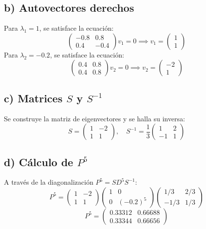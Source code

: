 \documentclass[letterpaper, 12pt]{article}
\begin{document}
    \subsection*{b) Autovectores derechos}
    Para $\lambda_1 = 1$, se satisface la ecuación:
    $$\begin{pmatrix} -0.8 & 0.8 \\ 0.4 & -0.4 \end{pmatrix} v_1 = 0 \implies v_1 = \begin{pmatrix} 1 \\ 1 \end{pmatrix}$$
    Para $\lambda_2 = -0.2$, se satisface la ecuación:
    $$\begin{pmatrix} 0.4 & 0.8 \\ 0.4 & 0.8 \end{pmatrix} v_2 = 0 \implies v_2 = \begin{pmatrix} -2 \\ 1 \end{pmatrix}$$

    \subsection*{c) Matrices $S$ y $S^{-1}$}
    Se construye la matriz de eigenvectores y se halla su inversa:
    $$S = \begin{pmatrix} 1 & -2 \\ 1 & 1 \end{pmatrix}, \quad S^{-1} = \frac{1}{3} \begin{pmatrix} 1 & 2 \\ -1 & 1 \end{pmatrix}$$

    \subsection*{d) Cálculo de $P^5$}
    A través de la diagonalización $P^5 = SD^5S^{-1}$:
    $$P^5 = \begin{pmatrix} 1 & -2 \\ 1 & 1 \end{pmatrix} \begin{pmatrix} 1 & 0 \\ 0 & (-0.2)^5 \end{pmatrix} \begin{pmatrix} 1/3 & 2/3 \\ -1/3 & 1/3 \end{pmatrix}$$
    $$P^5 = \begin{pmatrix} 0.33312 & 0.66688 \\ 0.33344 & 0.66656 \end{pmatrix}$$
\end{document}
